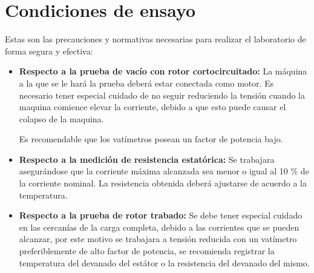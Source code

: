 \documentclass[11pt,letterpaper]{article}     %
\begin{document}
\section{Condiciones de ensayo}
Estas son las precauciones y normativas necesarias para realizar el laboratorio de forma segura y efectiva: 
\begin{itemize}
    \item \textbf{Respecto a la prueba de vacío con rotor cortocircuitado:} La máquina a la que se le hará la prueba deberá estar conectada como motor. Es necesario tener especial cuidado de no seguir reduciendo la tensión cuando la maquina comience elevar la corriente, debido a que esto puede causar el colapso de la maquina.
   
    Es recomendable que los vatímetros posean un factor de potencia bajo.
    \item \textbf{Respecto a la medición de resistencia estatórica:} Se trabajara asegurándose que la corriente máxima alcanzada sea menor o igual al 10 \% de la corriente nominal. La resistencia obtenida deberá ajustarse de acuerdo a la temperatura.
    \item \textbf{Respecto a la prueba de rotor trabado:} Se debe tener especial cuidado en las cercanías de la carga completa, debido a las corrientes que se pueden alcanzar, por este motivo se trabajara a tensión reducida con un vatímetro preferiblemente de alto factor de potencia, se recomienda registrar  la temperatura del devanado del estátor o la resistencia del devanado del mismo.
    

\end{itemize}
\end{document}
